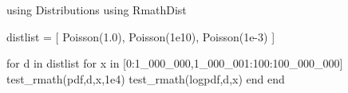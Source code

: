 using Distributions
using RmathDist

distlist = [
            Poisson(1.0),
            Poisson(1e10),
            Poisson(1e-3)
            ]

for d in distlist
    for x in [0:1_000_000,1_000_001:100:100_000_000]
        test_rmath(pdf,d,x,1e4)
        test_rmath(logpdf,d,x)
    end
end
